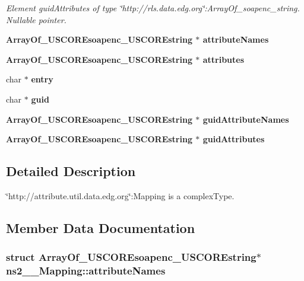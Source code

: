 \begin{CompactItemize}
\begin{CompactList}\small\item\em Element guid\-Attributes of type \char`\"{}http://rls.data.edg.org\char`\"{}:Array\-Of\_\-soapenc\_\-string. Nullable pointer. \item\end{CompactList}\item 
\bf{Array\-Of\_\-USCOREsoapenc\_\-USCOREstring} $\ast$ \textbf{attribute\-Names}\label{structns2____Mapping_4b80c1068ebe2c530a7efd1d613c869a}

\item 
\bf{Array\-Of\_\-USCOREsoapenc\_\-USCOREstring} $\ast$ \textbf{attributes}\label{structns2____Mapping_239e76c8fa630493230f81cb26c42368}

\item 
char $\ast$ \textbf{entry}\label{structns2____Mapping_37164b7a9f5b4828b78b3edc2d1db656}

\item 
char $\ast$ \textbf{guid}\label{structns2____Mapping_b23babab55f61e9f3dd9154a1ce88e49}

\item 
\bf{Array\-Of\_\-USCOREsoapenc\_\-USCOREstring} $\ast$ \textbf{guid\-Attribute\-Names}\label{structns2____Mapping_c53c70829394dd85f68cff7c4f111b42}

\item 
\bf{Array\-Of\_\-USCOREsoapenc\_\-USCOREstring} $\ast$ \textbf{guid\-Attributes}\label{structns2____Mapping_6d621ef8882153203d71881540f88177}

\end{CompactItemize}


\subsection{Detailed Description}
\char`\"{}http://attribute.util.data.edg.org\char`\"{}:Mapping is a complex\-Type. 



\subsection{Member Data Documentation}
\subsubsection{\setlength{\rightskip}{0pt plus 5cm}struct \bf{Array\-Of\_\-USCOREsoapenc\_\-USCOREstring}$\ast$ \bf{ns2\_\-\_\-Mapping::attribute\-Names}}\label{structns2____Mapping_4b80c1068ebe2c530a7efd1d613c869a}


